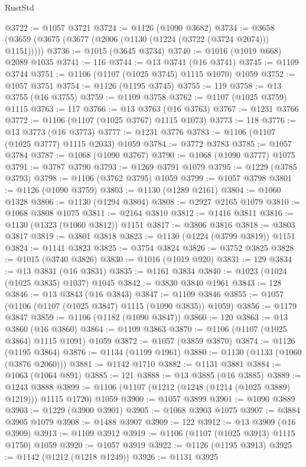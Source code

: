 \begin{lexlean}{RustStd}
\begin{coremodule}
{\begin{coremodule}
{{{{{{{{{{{{{{{{{{{{{{{{{{{{{{{{{{{@3722 := @1057 @3721
@3724 := @1126 (@1090 @3682)
@3734 := @3658 (@3659 (@3675 (@3677 (@2006 (@1130 (@1224 (@3722 (@3724 @2074))) @1151)))))
@3736 := @1015 (@3645 @3734)
@3740 := @1016 (@1019 @668) @2089 @1035
@3741 := 116
@3744 := @13 @3741 (@16 @3741)
@3745 := @1109 @3744
@3751 := @1106 (@1107 (@1025 @3745) @1115 @1070) @1059
@3752 := @1057 @3751
@3754 := @1126 (@1195 @3745)
@3755 := 119
@3758 := @13 @3755 (@16 @3755)
@3759 := @1109 @3758
@3762 := @1107 (@1025 @3759) @1115
@3763 := 117
@3766 := @13 @3763 (@16 @3763)
@3767 := @1231 @3766
@3772 := @1106 (@1107 (@1025 @3767) @1115 @1073)
@3773 := 118
@3776 := @13 @3773 (@16 @3773)
@3777 := @1231 @3776
@3783 := @1106 (@1107 (@1025 @3777) @1115 @2033) @1059
@3784 := @3772 @3783
@3785 := @1057 @3784
@3787 := @1068 (@1090 @3767)
@3790 := @1068 (@1090 @3777) @1075
@3791 := @3787 @3790
@3793 := @1269 @3791 @1079
@3795 := @1229 (@3785 @3793)
@3798 := @1106 (@3762 @3795) @1059
@3799 := @1057 @3798
@3801 := @1126 (@1090 @3759)
@3803 := @1130 (@1289 @2161)
@3804 := @1060 @1328
@3806 := @1130 (@1294 @3804)
@3808 := @2927 @2165 @1079
@3810 := @1068 @3808 @1075
@3811 := @2164 @3810
@3812 := @1416 @3811
@3816 := @1130 (@1323 (@1060 @3812)) @1151
@3817 := @3806 @3816
@3818 := @3803 @3817
@3819 := @3801 @3818
@3823 := @1130 (@1224 (@3799 @3819)) @1151
@3824 := @1141 @3823
@3825 := @3754 @3824
@3826 := @3752 @3825
@3828 := @1015 (@3740 @3826)
@3830 := @1016 (@1019 @920)
@3831 := 129
@3834 := @13 @3831 (@16 @3831)
@3835 := @1161 @3834
@3840 := @1023 (@1024 (@1025 @3835) @1037) @1045
@3842 := @3830 @3840 @1961
@3843 := 128
@3846 := @13 @3843 (@16 @3843)
@3847 := @1109 @3846
@3855 := @1057 (@1106 (@1107 (@1025 @3847) @1115 (@1090 @3835)) @1059)
@3856 := @1179 @3847
@3859 := @1106 (@1182 (@1090 @3847))
@3860 := 120
@3863 := @13 @3860 (@16 @3860)
@3864 := @1109 @3863
@3870 := @1106 (@1107 (@1025 @3864) @1115 @1091) @1059
@3872 := @1057 (@3859 @3870)
@3874 := @1126 (@1195 @3864)
@3876 := @1134 (@1199 @1961)
@3880 := @1130 (@1133 (@1060 (@3876 @2060)))
@3881 := @1142 @1710
@3882 := @1131 @3881
@3884 := @1063 (@1064 @891)
@3885 := 121
@3888 := @13 @3885 (@16 @3885)
@3889 := @1243 @3888
@3899 := @1106 (@1107 (@1212 (@1248 (@1214 (@1025 @3889) @1219))) @1115 @1720) @1059
@3900 := @1057 @3899
@3901 := @1090 @3889
@3903 := @1229 (@3900 @3901)
@3905 := @1068 @3903 @1075
@3907 := @3884 @3905 @1079
@3908 := @1488 @3907
@3909 := 122
@3912 := @13 @3909 (@16 @3909)
@3913 := @1109 @3912
@3919 := @1106 (@1107 (@1025 @3913) @1115 @1750) @1059
@3920 := @1057 @3919
@3922 := @1126 (@1195 @3913)
@3925 := @1142 (@1212 (@1218 @1249))
@3926 := @1131 @3925
}}}}}}}}}}}}}}}}}}}}}}}}}}}}}}}}}}}
\end{coremodule}}
\end{coremodule}
\end{lexlean}
